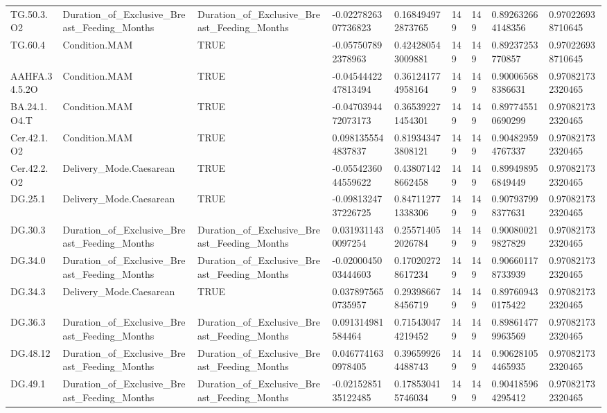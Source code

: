 \begin{longtable}{lllllllll}
TG.50.3.O2 & Duration\_of\_Exclusive\_Breast\_Feeding\_Months & Duration\_of\_Exclusive\_Breast\_Feeding\_Months & -0.0227826307736823 & 0.168494972873765 & 149 & 149 & 0.892632664148356 & 0.970226938710645 \\
TG.60.4 & Condition.MAM & TRUE & -0.057507892378963 & 0.424280543009881 & 149 & 149 & 0.89237253770857 & 0.970226938710645 \\
AAHFA.34.5.2O & Condition.MAM & TRUE & -0.0454442247813494 & 0.361241774958164 & 149 & 149 & 0.900065688386631 & 0.970821732320465 \\
BA.24.1.O4.T & Condition.MAM & TRUE & -0.0470394472073173 & 0.365392271454301 & 149 & 149 & 0.897745510690299 & 0.970821732320465 \\
Cer.42.1.O2 & Condition.MAM & TRUE & 0.0981355544837837 & 0.819343473808121 & 149 & 149 & 0.904829594767337 & 0.970821732320465 \\
Cer.42.2.O2 & Delivery\_Mode.Caesarean & TRUE & -0.0554236044559622 & 0.438071428662458 & 149 & 149 & 0.899498956849449 & 0.970821732320465 \\
DG.25.1 & Delivery\_Mode.Caesarean & TRUE & -0.0981324737226725 & 0.847112771338306 & 149 & 149 & 0.907937998377631 & 0.970821732320465 \\
DG.30.3 & Duration\_of\_Exclusive\_Breast\_Feeding\_Months & Duration\_of\_Exclusive\_Breast\_Feeding\_Months & 0.0319311430097254 & 0.255714052026784 & 149 & 149 & 0.900800219827829 & 0.970821732320465 \\
DG.34.0 & Duration\_of\_Exclusive\_Breast\_Feeding\_Months & Duration\_of\_Exclusive\_Breast\_Feeding\_Months & -0.0200045003444603 & 0.170202728617234 & 149 & 149 & 0.906601178733939 & 0.970821732320465 \\
DG.34.3 & Delivery\_Mode.Caesarean & TRUE & 0.0378975650735957 & 0.293986678456719 & 149 & 149 & 0.897609430175422 & 0.970821732320465 \\
DG.36.3 & Duration\_of\_Exclusive\_Breast\_Feeding\_Months & Duration\_of\_Exclusive\_Breast\_Feeding\_Months & 0.091314981584464 & 0.715430474219452 & 149 & 149 & 0.898614779963569 & 0.970821732320465 \\
DG.48.12 & Duration\_of\_Exclusive\_Breast\_Feeding\_Months & Duration\_of\_Exclusive\_Breast\_Feeding\_Months & 0.0467741630978405 & 0.396599264488743 & 149 & 149 & 0.906281054465935 & 0.970821732320465 \\
DG.49.1 & Duration\_of\_Exclusive\_Breast\_Feeding\_Months & Duration\_of\_Exclusive\_Breast\_Feeding\_Months & -0.0215285135122485 & 0.178530415746034 & 149 & 149 & 0.904185964295412 & 0.970821732320465 \\

\end{longtable}
